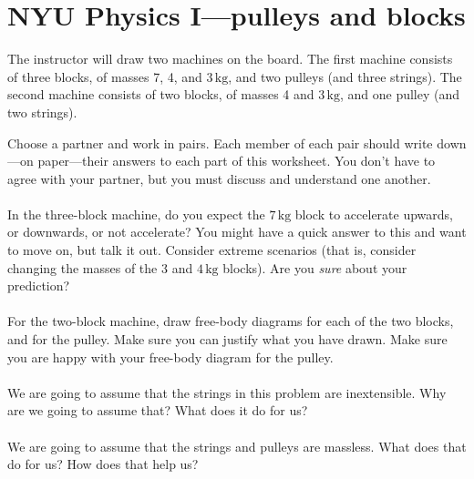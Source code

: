 \documentclass[12pt]{article}
\begin{document}
\newcommand{\kg}{\mathrm{kg}}
\thispagestyle{empty}

\section*{NYU Physics I---pulleys and blocks}

The instructor will draw two machines on the board. The first machine
consists of three blocks, of masses 7, 4, and $3\,\kg$, and two
pulleys (and three strings). The second machine consists of two
blocks, of masses 4 and $3\,\kg$, and one pulley (and two strings).

Choose a partner and work in pairs. Each member of each pair should
write down---on paper---their answers to each part of this worksheet.
You don't have to agree with your partner, but you must discuss and
understand one another.

\paragraph{\theproblem}%
In the three-block machine, do you expect the $7\,\kg$ block to
accelerate upwards, or downwards, or not accelerate? You might have a
quick answer to this and want to move on, but talk it out. Consider
extreme scenarios (that is, consider changing the masses of the 3 and
$4\,\kg$ blocks). Are you \emph{sure} about your prediction?

\paragraph{\theproblem}%
For the two-block machine, draw free-body diagrams for each of the two
blocks, and for the pulley. Make sure you can justify what you have
drawn. Make sure you are happy with your free-body diagram for the
pulley.

\paragraph{\theproblem}%
We are going to assume that the strings in this problem are
inextensible. Why are we going to assume that? What does it do for us?

\paragraph{\theproblem}%
We are going to assume that the strings and pulleys are massless. What
does that do for us? How does that help us?
\end{document}
